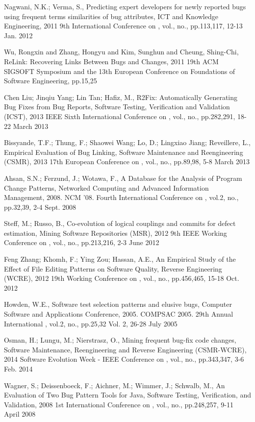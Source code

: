 \documentclass[conference]{IEEEtran}
\begin{document}
\begin{thebibliography}{1}
   Nagwani, N.K.; Verma, S., Predicting expert developers for newly reported bugs using frequent terms similarities of bug attributes, ICT and Knowledge Engineering, 2011 9th International Conference on , vol., no., pp.113,117, 12-13 Jan. 2012

   Wu, Rongxin and Zhang, Hongyu and Kim, Sunghun and Cheung, Shing-Chi, ReLink: Recovering Links Between Bugs and Changes, 2011 19th ACM SIGSOFT Symposium and the 13th European Conference on Foundations of Software Engineering, pp.15,25

   Chen Liu; Jinqiu Yang; Lin Tan; Hafiz, M., R2Fix: Automatically Generating Bug Fixes from Bug Reports, Software Testing, Verification and Validation (ICST), 2013 IEEE Sixth International Conference on , vol., no., pp.282,291, 18-22 March 2013

  Bissyande, T.F.; Thung, F.; Shaowei Wang; Lo, D.; Lingxiao Jiang; Reveillere, L., Empirical Evaluation of Bug Linking, Software Maintenance and Reengineering (CSMR), 2013 17th European Conference on , vol., no., pp.89,98, 5-8 March 2013


   Ahsan, S.N.; Ferzund, J.; Wotawa, F., A Database for the Analysis of Program Change Patterns, Networked Computing and Advanced Information Management, 2008. NCM '08. Fourth International Conference on , vol.2, no., pp.32,39, 2-4 Sept. 2008

  Steff, M.; Russo, B., Co-evolution of logical couplings and commits for defect estimation, Mining Software Repositories (MSR), 2012 9th IEEE Working Conference on , vol., no., pp.213,216, 2-3 June 2012

   Feng Zhang; Khomh, F.; Ying Zou; Hassan, A.E., An Empirical Study of the Effect of File Editing Patterns on Software Quality, Reverse Engineering (WCRE), 2012 19th Working Conference on , vol., no., pp.456,465, 15-18 Oct. 2012

   Howden, W.E., Software test selection patterns and elusive bugs, Computer Software and Applications Conference, 2005. COMPSAC 2005. 29th Annual International , vol.2, no., pp.25,32 Vol. 2, 26-28 July 2005

   Osman, H.; Lungu, M.; Nierstrasz, O., Mining frequent bug-fix code changes, Software Maintenance, Reengineering and Reverse Engineering (CSMR-WCRE), 2014 Software Evolution Week - IEEE Conference on , vol., no., pp.343,347, 3-6 Feb. 2014

   Wagner, S.; Deissenboeck, F.; Aichner, M.; Wimmer, J.; Schwalb, M., An Evaluation of Two Bug Pattern Tools for Java, Software Testing, Verification, and Validation, 2008 1st International Conference on , vol., no., pp.248,257, 9-11 April 2008

\end{thebibliography}


\end{document}
